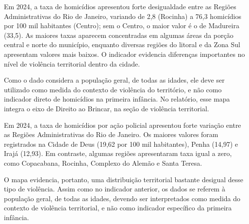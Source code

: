 
Em 2024, a taxa de homicídios apresentou forte desigualdade entre as Regiões Administrativas do Rio de Janeiro, variando de 2,8 (Rocinha) a 76,3 homicídios por 100 mil habitantes (Centro); sem o Centro, o maior valor é o de Madureira (33,5). As maiores taxas aparecem concentradas em algumas áreas da porção central e norte do município, enquanto diversas regiões do litoral e da Zona Sul apresentam valores mais baixos. O indicador evidencia diferenças importantes no nível de violência territorial dentro da cidade.

Como o dado considera a população geral, de todas as idades, ele deve ser utilizado como medida do contexto de violência do território, e não como indicador direto de homicídios na primeira infância. No relatório, esse mapa integra o eixo de Direito ao Brincar, na seção de violência territorial.


Em 2024, a taxa de homicídios por ação policial apresentou forte variação entre as Regiões Administrativas do Rio de Janeiro. Os maiores valores foram registrados na Cidade de Deus (19,62 por 100 mil habitantes), Penha (14,97) e Irajá (12,93). Em contraste, algumas regiões apresentaram taxa igual a zero, como Copacabana, Rocinha, Complexo do Alemão e Santa Teresa.

O mapa evidencia, portanto, uma distribuição territorial bastante desigual desse tipo de violência. Assim como no indicador anterior, os dados se referem à população geral, de todas as idades, devendo ser interpretados como medida do contexto de violência territorial, e não como indicador específico da primeira infância.


